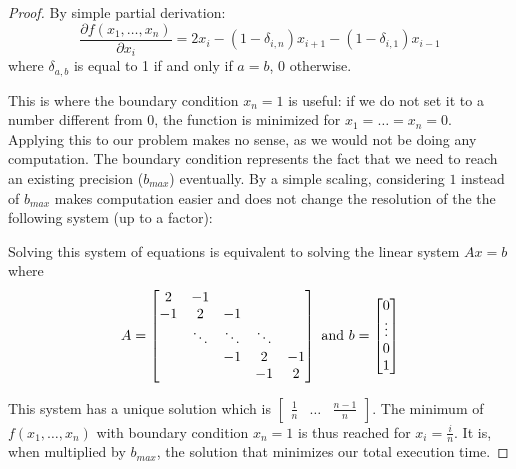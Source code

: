 \begin{proof}
    By simple partial derivation: \[ \frac{\partial f(x_1,\dots,x_n)}{\partial
    x_i} = 2x_i - (1-\delta_{i,n})x_{i+1} - (1-\delta_{i,1})x_{i-1} \] where
    $\delta_{a,b} $ is equal to 1 if and only if $a=b$, 0 otherwise.

    This is where the boundary condition $x_n = 1$ is useful: if we do not set it
    to a number different from 0, the function is minimized for
    $x_1=\dots=x_n=0$. Applying this to our problem makes no sense, as we
    would not be doing any computation. The boundary condition represents the
    fact that we need to reach an existing precision ($b_{max}$) eventually. By
    a simple scaling, considering $1$ instead of $b_{max}$ makes computation
    easier and does not change the resolution of the the following system (up
    to a factor):


    Solving this system of equations is equivalent to solving the linear system $Ax=b$ where
    \[ A =
    \begin{bmatrix}
    2       & -1 &  &  &  \\
    -1       & 2 & -1 &  &  \\
    & \ddots & \ddots & \ddots & \\
    & & -1 & 2 & -1 \\
           &  &  & -1 & 2
    \end{bmatrix}
    \textup{ and } b = \begin{bmatrix} 0 \\ \vdots \\ 0 \\ 1 \end{bmatrix} \]

    This system has a unique solution which is $\begin{bmatrix} \frac{1}{n} & \dots
    & \frac{n-1}{n} \end{bmatrix}$.  The minimum of $f(x_1,\dots,x_n)$ with
    boundary condition $x_n=1$ is thus reached for $x_i = \frac{i}{n}$.  It
    is, when multiplied by $b_{max}$, the solution that minimizes our total
    execution time.

\end{proof}

